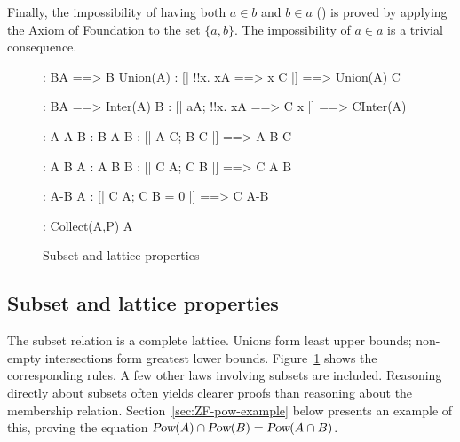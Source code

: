 Finally, the impossibility of having both $a\in b$ and $b\in a$
() is proved by applying the Axiom of Foundation to
the set $\{a,b\}$.  The impossibility of $a\in a$ is a trivial consequence.



\begin{figure}
\begin{alltt*}\isastyleminor
{}:    B\isasymin{}A ==> B \isasymsubseteq Union(A)
:    [| !!x. x\isasymin{}A ==> x \isasymsubseteq C |] ==> Union(A) \isasymsubseteq C

:    B\isasymin{}A ==> Inter(A) \isasymsubseteq B
: [| a\isasymin{}A; !!x. x\isasymin{}A ==> C \isasymsubseteq x |] ==> C\isasymsubseteq{}Inter(A)

:      A \isasymsubseteq A \isasymunion B
:      B \isasymsubseteq A \isasymunion B
:       [| A \isasymsubseteq C;  B \isasymsubseteq C |] ==> A \isasymunion B \isasymsubseteq C

:     A \isasyminter B \isasymsubseteq A
:     A \isasyminter B \isasymsubseteq B
:   [| C \isasymsubseteq A;  C \isasymsubseteq B |] ==> C \isasymsubseteq A \isasyminter B

:    A-B \isasymsubseteq A
:  [| C \isasymsubseteq A;  C \isasyminter B = 0 |] ==> C \isasymsubseteq A-B

: Collect(A,P) \isasymsubseteq A
\end{alltt*}
\caption{Subset and lattice properties} \label{zf-subset}
\end{figure}


\subsection{Subset and lattice properties}
The subset relation is a complete lattice.  Unions form least upper bounds;
non-empty intersections form greatest lower bounds.  Figure~\ref{zf-subset}
shows the corresponding rules.  A few other laws involving subsets are
included. 
Reasoning directly about subsets often yields clearer proofs than
reasoning about the membership relation.  Section~\ref{sec:ZF-pow-example}
below presents an example of this, proving the equation 
${\emph{\sl Pow}(A)\cap \emph{\sl Pow}(B)}= \emph{\sl Pow}(A\cap B)$.


